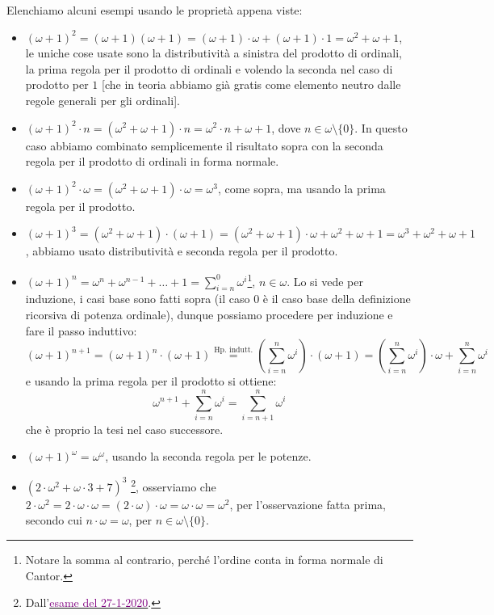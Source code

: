 \begin{example}
	Elenchiamo alcuni esempi usando le proprietà appena viste:
	\begin{itemize}
		\item $(\omega + 1)^2 = (\omega + 1)(\omega + 1) = (\omega + 1)\cdot \omega + (\omega + 1) \cdot 1 = \omega^2 + \omega + 1$, le uniche cose usate sono la distributività a sinistra del prodotto di ordinali, la prima regola per il prodotto di ordinali e volendo la seconda nel caso di prodotto per $1$ [che in teoria abbiamo già gratis come elemento neutro dalle regole generali per gli ordinali].
		\item $(\omega + 1)^2 \cdot n = (\omega^2 + \omega + 1) \cdot n = \omega^2 \cdot n + \omega + 1$, dove $n \in \omega\setminus\{0\}$. In questo caso abbiamo combinato semplicemente il risultato sopra con la seconda regola per il prodotto di ordinali in forma normale.
		\item $(\omega + 1)^2 \cdot \omega = (\omega^2 + \omega + 1) \cdot \omega = \omega^3$, come sopra, ma usando la prima regola per il prodotto.
		\item $(\omega + 1)^3 = (\omega^2 + \omega + 1) \cdot (\omega + 1) = (\omega^2 + \omega + 1) \cdot \omega + \omega^2 + \omega + 1 = \omega^3 + \omega^2 + \omega + 1$, abbiamo usato distributività e seconda regola per il prodotto.
		\item $(\omega + 1)^n = \omega^n + \omega^{n - 1} + \ldots + 1 = \sum_{i = n}^0 \omega^i$\footnote{Notare la somma al contrario, perché l'ordine conta in forma normale di Cantor.}, $n \in \omega$. Lo si vede per induzione, i casi base sono fatti sopra (il caso 0 è il caso base della definizione ricorsiva di potenza ordinale), dunque possiamo procedere per induzione e fare il passo induttivo:
		\[ (\omega + 1)^{n + 1} = (\omega + 1)^n \cdot (\omega + 1) \overset{\text{Hp. indutt.}}{=} \left(\sum_{i = n}^n \omega^i\right) \cdot (\omega + 1) = \left(\sum_{i = n}^n \omega^i\right) \cdot \omega + \sum_{i = n}^n \omega^i
			\]
		e usando la prima regola per il prodotto si ottiene:
		\[ \omega^{n + 1} + \sum_{i = n}^n \omega^i = \sum_{i = n + 1}^n \omega^i
			\]
		che è proprio la tesi nel caso successore.
		\item $(\omega + 1)^\omega = \omega^\omega$, usando la seconda regola per le potenze.
		\item $(2 \cdot \omega^2 + \omega \cdot 3 + 7)^3$ \footnote{Dall'\href{https://ciovil.li/eti20/exam05.pdf}{\textcolor{purple}{esame del 27-1-2020}}.}, osserviamo che $2 \cdot \omega^2 = 2 \cdot \omega \cdot \omega = (2 \cdot \omega) \cdot \omega = \omega \cdot \omega = \omega^2$, per l'osservazione fatta prima, secondo cui $n \cdot \omega = \omega$, per $n \in \omega\setminus\{0\}$.

\end{itemize}
\end{example}
